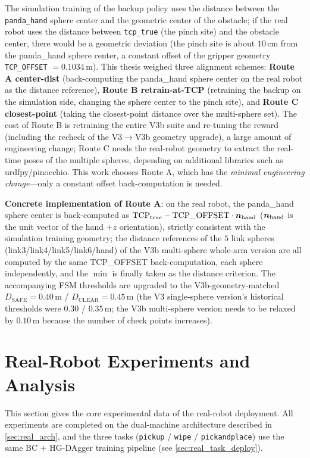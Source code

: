 The simulation training of the backup policy uses the distance between the \texttt{panda\_hand} sphere center and the geometric center of the obstacle; if the real robot uses the distance between \texttt{tcp\_true} (the pinch site) and the obstacle center, there would be a geometric deviation (the pinch site is about $10$\,cm from the panda\_hand sphere center, a constant offset of the gripper geometry \texttt{TCP\_OFFSET} $= 0.1034$\,m). This thesis weighed three alignment schemes: \textbf{Route A center-dist} (back-computing the panda\_hand sphere center on the real robot as the distance reference), \textbf{Route B retrain-at-TCP} (retraining the backup on the simulation side, changing the sphere center to the pinch site), and \textbf{Route C closest-point} (taking the closest-point distance over the multi-sphere set). The cost of Route B is retraining the entire V3b suite and re-tuning the reward (including the recheck of the V3$\to$V3b geometry upgrade), a large amount of engineering change; Route C needs the real-robot geometry to extract the real-time poses of the multiple spheres, depending on additional libraries such as urdfpy/pinocchio. This work chooses Route A, which has the \emph{minimal engineering change}---only a constant offset back-computation is needed.

\textbf{Concrete implementation of Route A}: on the real robot, the panda\_hand sphere center is back-computed as $\text{TCP}_\text{true} - \text{TCP\_OFFSET} \cdot \bm{n}_\text{hand}$ ($\bm{n}_\text{hand}$ is the unit vector of the hand $+z$ orientation), strictly consistent with the simulation training geometry; the distance references of the $5$ link spheres (link3/link4/link5/link6/hand) of the V3b multi-sphere whole-arm version are all computed by the same TCP\_OFFSET back-computation, each sphere independently, and the $\min$ is finally taken as the distance criterion. The accompanying FSM thresholds are upgraded to the V3b-geometry-matched $D_\text{SAFE} = 0.40$\,m / $D_\text{CLEAR} = 0.45$\,m (the V3 single-sphere version's historical thresholds were $0.30$ / $0.35$\,m; the V3b multi-sphere version needs to be relaxed by $0.10$\,m because the number of check points increases).

\section{Real-Robot Experiments and Analysis}\label{sec:real_experiments}

This section gives the core experimental data of the real-robot deployment. All experiments are completed on the dual-machine architecture described in \cref{sec:real_arch}, and the three tasks (\texttt{pickup} / \texttt{wipe} / \texttt{pickandplace}) use the same BC $+$ HG-DAgger training pipeline (see \cref{sec:real_task_deploy}).

